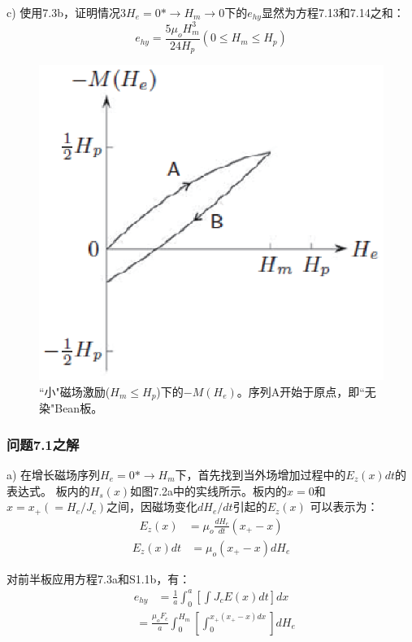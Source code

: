 c) 使用7.3b，证明情况3$H_e=0*\rightarrow H_m\rightarrow 0$下的$e_{hy}$显然为方程7.13和7.14之和：
\begin{equation}%
e_{hy}=\frac{5\mu_oH_{m}^{3}}{24H_p}      (0\leq H_m\leq H_p)
\end{equation}
\begin{figure}[htbp]
	\centering
	\includegraphics[scale=0.8]{chpt7/figs/fig7.10.eps}
	\caption{``小"磁场激励($H_m\le H_p$)下的$-M(H_e)$。序列A开始于原点，即``无染"Bean板。}
\end{figure}

\subsubsection{问题7.1之解}
a) 在增长磁场序列$H_e=0*\rightarrow H_m$下，首先找到当外场增加过程中的$E_z(x)dt$的表达式。
板内的$H_s(x)$如图7.2a中的实线所示。板内的$x=0$和$x=x_+(=H_e/J_c)$之间，因磁场变化$dH_e/dt$引起的$E_z(x)$
可以表示为：
\begin{align*}%
E_z(x)&=\mu_o\frac{dH_e}{dt}(x_+-x)\tag{S1.1a}
\end{align*}
\begin{align*}
E_z(x)dt&=\mu_o(x_+-x)dH_e \tag{S1.1b}
\end{align*}

对前半板应用方程7.3a和S1.1b，有：
\begin{align*}%
e_{hy}&=\frac{1}{a}\int_{0}^{a}\left[\int J_cE(x)dt\right]dx \tag{S1.2a}
\end{align*}
\begin{align*}
&=\frac{\mu_oF_c}{a}\int_{0}^{H_m}\left[\int_{0}^{x_+(x_+-x)dx}\right]dH_e \tag{S1.2b}
\end{align*}

